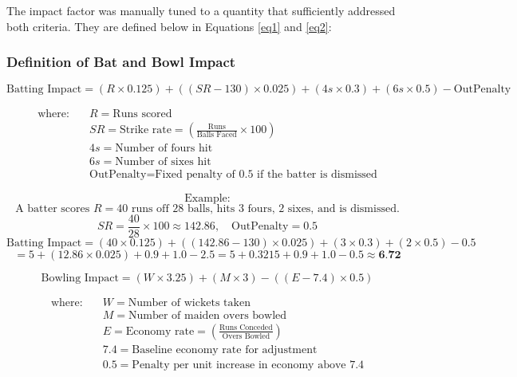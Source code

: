 \documentclass{article}[12pt]
\begin{document}
The impact factor was manually tuned to a quantity that sufficiently addressed both criteria. They are defined below in Equations \ref{eq1} and \ref{eq2}:

\subsubsection{Definition of Bat and Bowl Impact}
\begin{equation}
    \text{Batting Impact} = (R \times 0.125) + ((SR - 130) \times 0.025) + (4s \times 0.3) + (6s \times 0.5) - \text{OutPenalty}
    \label{eq1}
\end{equation}



\[
\begin{aligned}
\text{where:} \quad 
& R = \text{Runs scored} \\
& SR = \text{Strike rate} = \left( \frac{\text{Runs}}{\text{Balls Faced}} \times 100 \right) \\
& 4s = \text{Number of fours hit} \\
& 6s = \text{Number of sixes hit} \\
& \text{OutPenalty} = \text{Fixed penalty of 0.5 if the batter is dismissed}
\end{aligned}
\]

\[
\text{Example:}
\]
\[
\text{A batter scores } R = 40 \text{ runs off } 28 \text{ balls, hits } 3 \text{ fours, 2 sixes, and is dismissed.}
\]
\[
SR = \frac{40}{28} \times 100 \approx 142.86, \quad \text{OutPenalty} = 0.5
\]
\[
\text{Batting Impact} = (40 \times 0.125) + ((142.86 - 130) \times 0.025) + (3 \times 0.3) + (2 \times 0.5) - 0.5
\]
\[
= 5 + (12.86 \times 0.025) + 0.9 + 1.0 - 2.5 = 5 + 0.3215 + 0.9 + 1.0 - 0.5 \approx \textbf{6.72}
\]

\begin{equation}
    \text{Bowling Impact} = (W \times 3.25) + (M \times 3) - ((E - 7.4) \times 0.5)
    \label{eq2}
\end{equation}

\[
\begin{aligned}
\text{where:} \quad 
& W = \text{Number of wickets taken} \\
& M = \text{Number of maiden overs bowled} \\
& E = \text{Economy rate} = \left( \frac{\text{Runs Conceded}}{\text{Overs Bowled}} \right) \\
& 7.4 = \text{Baseline economy rate for adjustment} \\
& 0.5 = \text{Penalty per unit increase in economy above 7.4}
\end{aligned}
\]
\end{document}
